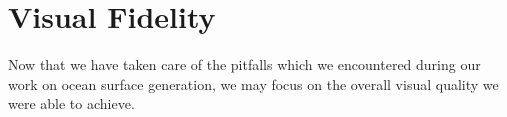 %
%
%




\section{Visual Fidelity}
\label{sec:results:fidelity}
%
Now that we have taken care of the pitfalls which we encountered during
our work on ocean surface generation, we may focus on the overall visual
quality we were able to achieve.


